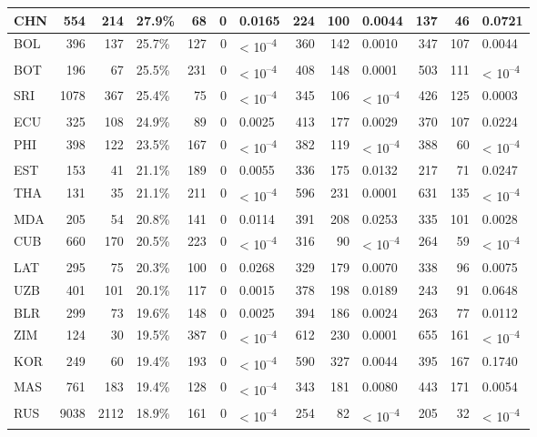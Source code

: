\begin{tabular}{l|r|r|l|r|r|l|r|r|l|r|r|l}
\hline
CHN & 554 & 214 & 27.9\% & 68 & 0 & 0.0165 & 224 & 100 & 0.0044 & 137 & 46 & 0.0721\\
\hline
BOL & 396 & 137 & 25.7\% & 127 & 0 & < 10\textsuperscript{--4} & 360 & 142 & 0.0010 & 347 & 107 & 0.0044\\
\hline
BOT & 196 & 67 & 25.5\% & 231 & 0 & < 10\textsuperscript{--4} & 408 & 148 & 0.0001 & 503 & 111 & < 10\textsuperscript{--4}\\
\hline
SRI & 1078 & 367 & 25.4\% & 75 & 0 & < 10\textsuperscript{--4} & 345 & 106 & < 10\textsuperscript{--4} & 426 & 125 & 0.0003\\
\hline
ECU & 325 & 108 & 24.9\% & 89 & 0 & 0.0025 & 413 & 177 & 0.0029 & 370 & 107 & 0.0224\\
\hline
PHI & 398 & 122 & 23.5\% & 167 & 0 & < 10\textsuperscript{--4} & 382 & 119 & < 10\textsuperscript{--4} & 388 & 60 & < 10\textsuperscript{--4}\\
\hline
EST & 153 & 41 & 21.1\% & 189 & 0 & 0.0055 & 336 & 175 & 0.0132 & 217 & 71 & 0.0247\\
\hline
THA & 131 & 35 & 21.1\% & 211 & 0 & < 10\textsuperscript{--4} & 596 & 231 & 0.0001 & 631 & 135 & < 10\textsuperscript{--4}\\
\hline
MDA & 205 & 54 & 20.8\% & 141 & 0 & 0.0114 & 391 & 208 & 0.0253 & 335 & 101 & 0.0028\\
\hline
CUB & 660 & 170 & 20.5\% & 223 & 0 & < 10\textsuperscript{--4} & 316 & 90 & < 10\textsuperscript{--4} & 264 & 59 & < 10\textsuperscript{--4}\\
\hline
LAT & 295 & 75 & 20.3\% & 100 & 0 & 0.0268 & 329 & 179 & 0.0070 & 338 & 96 & 0.0075\\
\hline
UZB & 401 & 101 & 20.1\% & 117 & 0 & 0.0015 & 378 & 198 & 0.0189 & 243 & 91 & 0.0648\\
\hline
BLR & 299 & 73 & 19.6\% & 148 & 0 & 0.0025 & 394 & 186 & 0.0024 & 263 & 77 & 0.0112\\
\hline
ZIM & 124 & 30 & 19.5\% & 387 & 0 & < 10\textsuperscript{--4} & 612 & 230 & 0.0001 & 655 & 161 & < 10\textsuperscript{--4}\\
\hline
KOR & 249 & 60 & 19.4\% & 193 & 0 & < 10\textsuperscript{--4} & 590 & 327 & 0.0044 & 395 & 167 & 0.1740\\
\hline
MAS & 761 & 183 & 19.4\% & 128 & 0 & < 10\textsuperscript{--4} & 343 & 181 & 0.0080 & 443 & 171 & 0.0054\\
\hline
RUS & 9038 & 2112 & 18.9\% & 161 & 0 & < 10\textsuperscript{--4} & 254 & 82 & < 10\textsuperscript{--4} & 205 & 32 & < 10\textsuperscript{--4}\\

\end{tabular}
